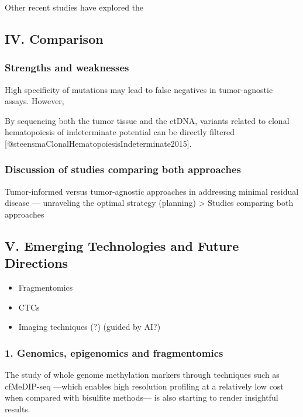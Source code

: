 \documentclass[
]{article}
\providecommand{\tightlist}{%
  \setlength{\itemsep}{0pt}\setlength{\parskip}{0pt}}
\begin{document}
Other recent studies have explored the

\subsection{IV. Comparison}\label{iv.-comparison}

\subsubsection{Strengths and weaknesses}\label{strengths-and-weaknesses}

High specificity of mutations may lead to false negatives in
tumor-agnostic assays. However,

By sequencing both the tumor tissue and the ctDNA, variants related to
clonal hematopoiesis of indeterminate potential can be directly filtered
{[}@steensmaClonalHematopoiesisIndeterminate2015{]}.

\subsubsection{Discussion of studies comparing both
approaches}\label{discussion-of-studies-comparing-both-approaches}

{Tumor-informed versus tumor-agnostic approaches in addressing minimal
residual disease --- unraveling the optimal strategy (planning)
\textgreater{} Studies comparing both approaches}

\subsection{V. Emerging Technologies and Future
Directions}\label{v.-emerging-technologies-and-future-directions}

\begin{itemize}
\tightlist
\item
  Fragmentomics
\item
  CTCs
\item
  Imaging techniques (?) (guided by AI?)
\end{itemize}

\subsubsection{1. Genomics, epigenomics and
fragmentomics}\label{genomics-epigenomics-and-fragmentomics}

The study of whole genome methylation markers through techniques such as
cfMeDIP-seq ---which enables high resolution profiling at a relatively
low cost when compared with bisulfite methods--- is also starting to
render insightful results.
\end{document}

